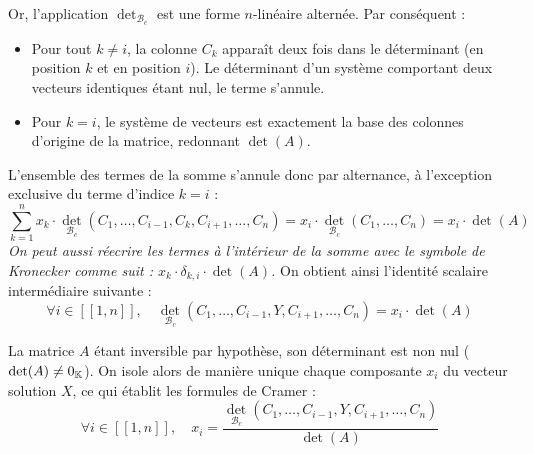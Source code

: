 \documentclass[12pt, a4paper]{report}
\begin{document}
Or, l'application $\det_{\mathcal{B}_c}$ est une forme $n$-linéaire alternée. Par conséquent :
\begin{itemize}
    \item Pour tout $k \neq i$, la colonne $C_k$ apparaît deux fois dans le déterminant (en position $k$ et en position $i$). Le déterminant d'un système comportant deux vecteurs identiques étant nul, le terme s'annule.
    \item Pour $k = i$, le système de vecteurs est exactement la base des colonnes d'origine de la matrice, redonnant $\det(A)$.
\end{itemize}
L'ensemble des termes de la somme s'annule donc par alternance, à l'exception exclusive du terme d'indice $k = i$ :
$$\sum_{k=1}^n x_k \cdot \det_{\mathcal{B}_c}(C_1, \dots, C_{i-1}, C_k, C_{i+1}, \dots, C_n) = x_i \cdot \det_{\mathcal{B}_c}(C_1, \dots, C_n) = x_i \cdot \det(A)$$
\textit{On peut aussi réecrire les termes à l'intérieur de la somme avec le symbole de Kronecker comme suit : $x_k \cdot \delta_{k,i} \cdot \det(A)$.}
On obtient ainsi l'identité scalaire intermédiaire suivante :
$$\forall i \in [\![1,n]\!], \quad \det_{\mathcal{B}_c}(C_1, \dots, C_{i-1}, Y, C_{i+1}, \dots, C_n) = x_i \cdot \det(A)$$

La matrice $A$ étant inversible par hypothèse, son déterminant est non nul ($\det(A) \neq 0_{\mathbb{K}}$). On isole alors de manière unique chaque composante $x_i$ du vecteur solution $X$, ce qui établit les formules de Cramer :
$$\forall i \in [\![1,n]\!], \quad x_i = \frac{\det_{\mathcal{B}_c}(C_1, \dots, C_{i-1}, Y, C_{i+1}, \dots, C_n)}{\det(A)}$$
\end{document}
